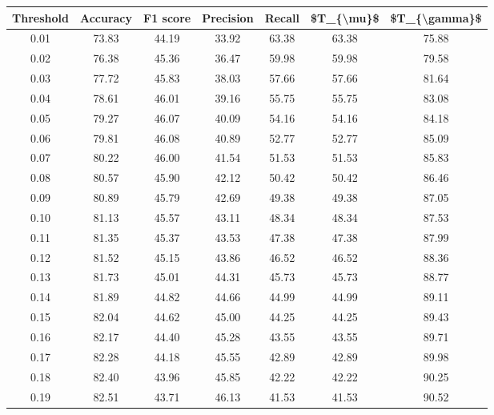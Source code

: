 \begin{tabular}{|c|c|c|c|c|c|c|}
\hline
 Threshold &  Accuracy &  F1 score &  Precision &  Recall &  \$T\_\{\textbackslash mu\}\$ &  \$T\_\{\textbackslash gamma\}\$ \\
\hline
      0.01 &     73.83 &     44.19 &      33.92 &   63.38 &      63.38 &         75.88 \\
      0.02 &     76.38 &     45.36 &      36.47 &   59.98 &      59.98 &         79.58 \\
      0.03 &     77.72 &     45.83 &      38.03 &   57.66 &      57.66 &         81.64 \\
      0.04 &     78.61 &     46.01 &      39.16 &   55.75 &      55.75 &         83.08 \\
      0.05 &     79.27 &     46.07 &      40.09 &   54.16 &      54.16 &         84.18 \\
      0.06 &     79.81 &     46.08 &      40.89 &   52.77 &      52.77 &         85.09 \\
      0.07 &     80.22 &     46.00 &      41.54 &   51.53 &      51.53 &         85.83 \\
      0.08 &     80.57 &     45.90 &      42.12 &   50.42 &      50.42 &         86.46 \\
      0.09 &     80.89 &     45.79 &      42.69 &   49.38 &      49.38 &         87.05 \\
      0.10 &     81.13 &     45.57 &      43.11 &   48.34 &      48.34 &         87.53 \\
      0.11 &     81.35 &     45.37 &      43.53 &   47.38 &      47.38 &         87.99 \\
      0.12 &     81.52 &     45.15 &      43.86 &   46.52 &      46.52 &         88.36 \\
      0.13 &     81.73 &     45.01 &      44.31 &   45.73 &      45.73 &         88.77 \\
      0.14 &     81.89 &     44.82 &      44.66 &   44.99 &      44.99 &         89.11 \\
      0.15 &     82.04 &     44.62 &      45.00 &   44.25 &      44.25 &         89.43 \\
      0.16 &     82.17 &     44.40 &      45.28 &   43.55 &      43.55 &         89.71 \\
      0.17 &     82.28 &     44.18 &      45.55 &   42.89 &      42.89 &         89.98 \\
      0.18 &     82.40 &     43.96 &      45.85 &   42.22 &      42.22 &         90.25 \\
      0.19 &     82.51 &     43.71 &      46.13 &   41.53 &      41.53 &         90.52 \\

\end{tabular}
